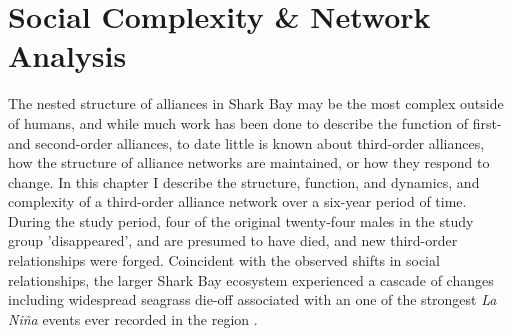 \documentclass[11pt]{amsart}
\begin{document}
\section{Social Complexity \& Network Analysis}

The nested structure of alliances in Shark Bay may be the most complex outside of humans, and while much work has been done to describe the function of first- and second-order alliances, to date little is known about third-order alliances, how the structure of alliance networks are maintained, or how they respond to change. In this chapter I describe the structure, function, and dynamics, and complexity of a third-order alliance network over a six-year period of time. During the study period, four of the original twenty-four males in the study group 'disappeared', and are presumed to have died, and new third-order relationships were forged. Coincident with the observed shifts in social relationships, the larger Shark Bay ecosystem experienced a cascade of changes including widespread seagrass die-off associated with an one of the strongest \emph{La Ni\~{n}a} events ever recorded in the region \citep{pearce:2011,thomson:2014}.  
\end{document}
